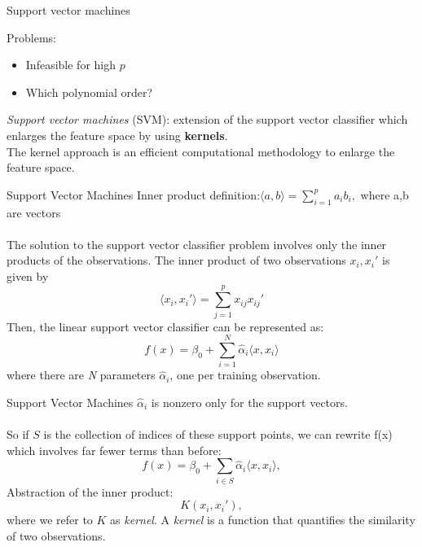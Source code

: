 \documentclass[notes]{beamer}          %
\begin{document}
\begin{frame}{Support vector machines}

Problems:
\begin{itemize}
	\item Infeasible for high $p$
	\item Which polynomial order?
\end{itemize}
\vspace{0.5cm}
\textit{Support vector machines} (SVM): extension of the support vector classifier which enlarges the feature space by using \textbf{kernels}.\\
\vspace{0.5cm}
The kernel approach is an efficient computational methodology to enlarge the feature space.


\end{frame}

\begin{frame}{Support Vector Machines}
Inner product definition:$\langle {a,b} \rangle = \sum_{i=1}^{p} a_{i}b_{i},$ where a,b are vectors\\~\\
The solution to the support vector classifier problem involves only the inner products of the observations. The inner product of two observations $x_i, x_i'$ is given by
\begin{equation*}
\langle {x_i,x_i'} \rangle = \sum_{j=1}^{p} x_{ij} x_{ij}' 
\end{equation*}
Then, the linear support vector classifier can be represented as:
\begin{equation*}
f(x) = \beta_0 + \sum_{i=1}^{N} \hat \alpha_i \langle {x,x_i} \rangle
\end{equation*}
where there are \textit{N} parameters $\hat \alpha_i$, one per training observation.
\end{frame}

%


\begin{frame}{Support Vector Machines}
$\hat{\alpha}_i$ is nonzero only for the support vectors. \\~\\
So if $\mathit{S}$ is the collection of indices of these support points, we can rewrite f(x) which involves far fewer terms than before:
\begin{equation*}
f(x) = \beta_0 + \sum_{i\in\mathit{S}} \hat{\alpha}_i \langle {x,x_i} \rangle,
\end{equation*}
Abstraction of the inner product:
\begin{equation*}
\mathit{K}(x_i,x_i'),
\end{equation*}
where we refer to $\mathit{K}$ as \textit{kernel}. 
A \textit{kernel} is a function that quantifies the similarity of two observations.
\end{frame}
\end{document}
